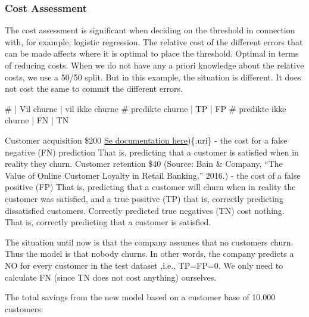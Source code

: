 \documentclass[
  letterpaper,
  DIV=11,
  numbers=noendperiod]{scrartcl}
\newenvironment{Shaded}{\begin{snugshade}}{\end{snugshade}}
\newcommand{\CommentTok}[1]{\textcolor[rgb]{0.37,0.37,0.37}{#1}}
\begin{document}
\subsubsection{\texorpdfstring{\textbf{Cost
Assessment}}{Cost Assessment}}\label{cost-assessment}

The cost assessment is significant when deciding on the threshold in
connection with, for example, logistic regression. The relative cost of
the different errors that can be made affects where it is optimal to
place the threshold. Optimal in terms of reducing costs. When we do not
have any a priori knowledge about the relative costs, we use a 50/50
split. But in this example, the situation is different. It does not cost
the same to commit the different errors.

\begin{Shaded}
\begin{Highlighting}[]
\CommentTok{\#                       |  Vil churne  | vil ikke churne}
\CommentTok{\# predikte churne       |      TP      |      FP}
\CommentTok{\# predikte ikke churne  |      FN      |      TN}
\end{Highlighting}
\end{Shaded}

Customer acquisition \$200
\href{https://www.reviewtrackers.com/blog/customer-acquisition-banking/\#:~:text=How\%20much\%20does\%20it\%20cost\%20a\%20bank\%20to,\%2866\%25\%29\%2C\%20and\%20SEO\%20\%2F\%20pay-per-click\%20\%28PPC\%29\%20advertising\%20\%2865\%25\%29.}{Se
documentation here})\{.uri\} - the cost for a false negative (FN)
prediction That is, predicting that a customer is satisfied when in
reality they churn. Customer retention \$40 (Source: Bain \& Company,
``The Value of Online Customer Loyalty in Retail Banking,'' 2016.) - the
cost of a false positive (FP) That is, predicting that a customer will
churn when in reality the customer was satisfied, and a true positive
(TP) that is, correctly predicting dissatisfied customers. Correctly
predicted true negatives (TN) cost nothing. That is, correctly
predicting that a customer is satisfied.

The situation until now is that the company assumes that no customers
churn. Thus the model is that nobody churns. In other words, the company
predicts a NO for every customer in the test dataset ,i.e., TP=FP=0. We
only need to calculate FN (since TN does not cost anything) ourselves.

The total savings from the new model based on a customer base of 10.000
customers:
\end{document}
